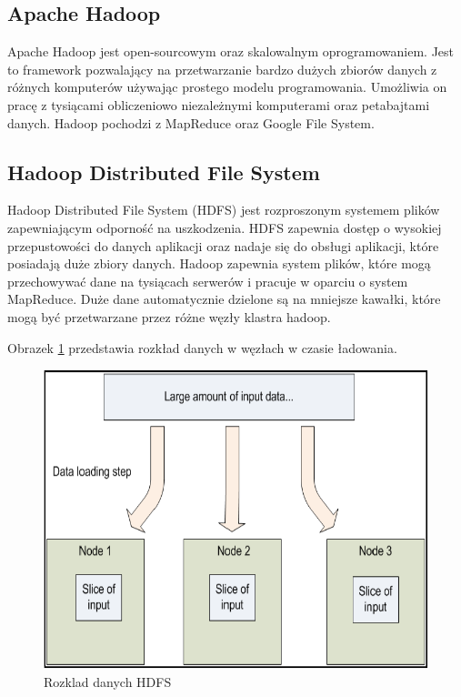 \documentclass[10pt,twocolumn]{llncs}          %
\begin{document}
\subsection{Apache Hadoop}
\label{ssub:apache_hadoop}
Apache Hadoop jest open-sourcowym oraz skalowalnym oprogramowaniem. Jest to framework pozwalający na przetwarzanie bardzo dużych zbiorów danych z różnych komputerów używając prostego modelu programowania. Umożliwia on pracę z tysiącami obliczeniowo niezależnymi komputerami oraz petabajtami danych. Hadoop pochodzi z MapReduce oraz Google File System.

\subsection{Hadoop Distributed File System}
\label{ssub:hdfs}
Hadoop Distributed File System (HDFS) jest rozproszonym systemem plików zapewniającym odporność na uszkodzenia. HDFS zapewnia dostęp o wysokiej przepustowości do danych aplikacji oraz nadaje się do obsługi aplikacji, które posiadają duże zbiory danych. Hadoop zapewnia system plików, które mogą przechowywać dane na tysiącach serwerów i pracuje w oparciu o system MapReduce. Duże dane automatycznie dzielone są na mniejsze kawałki, które mogą być przetwarzane przez różne węzły klastra hadoop.

Obrazek \ref{fig:rozklad_danych} przedstawia rozkład danych w węzłach w czasie ładowania.


\begin{figure}
    \centerline{\includegraphics[scale=0.3]{obrazki/rozklad_danych.png}}
    \caption{Rozklad danych HDFS}
    \label{fig:rozklad_danych}       %
\end{figure}
\end{document}
